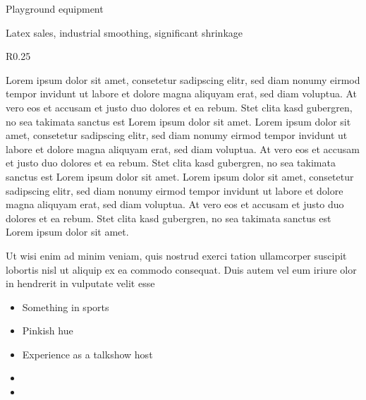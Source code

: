 \documentclass[master,english]{tithesisnotice}
\begin{document}
Playground equipment

Latex sales, industrial smoothing, significant shrinkage

\begin{wrapfigure}{R}{0.25\textwidth}
  \begin{center}
  \end{center}
\end{wrapfigure}
Lorem ipsum dolor sit amet, consetetur sadipscing elitr, sed diam nonumy eirmod
tempor invidunt ut labore et dolore magna aliquyam erat, sed diam voluptua. At
vero eos et accusam et justo duo dolores et ea rebum. Stet clita kasd
gubergren, no sea takimata sanctus est Lorem ipsum dolor sit amet. Lorem ipsum
dolor sit amet, consetetur sadipscing elitr, sed diam nonumy eirmod tempor
invidunt ut labore et dolore magna aliquyam erat, sed diam voluptua. At vero
eos et accusam et justo duo dolores et ea rebum. Stet clita kasd gubergren, no
sea takimata sanctus est Lorem ipsum dolor sit amet. Lorem ipsum dolor sit
amet, consetetur sadipscing elitr, sed diam nonumy eirmod tempor invidunt ut
labore et dolore magna aliquyam erat, sed diam voluptua. At vero eos et accusam
et justo duo dolores et ea rebum. Stet clita kasd gubergren, no sea takimata
sanctus est Lorem ipsum dolor sit amet.

Ut wisi enim ad minim veniam, quis nostrud exerci tation ullamcorper suscipit
lobortis nisl ut aliquip ex ea commodo consequat. Duis autem vel eum iriure
olor in hendrerit in vulputate velit esse

\begin{itemize}
  \item Something in sports
  \item Pinkish hue
  \item Experience as a talkshow host
\end{itemize}

\begin{itemize}
  \item {}
  \item {}
\end{itemize}
\end{document}
